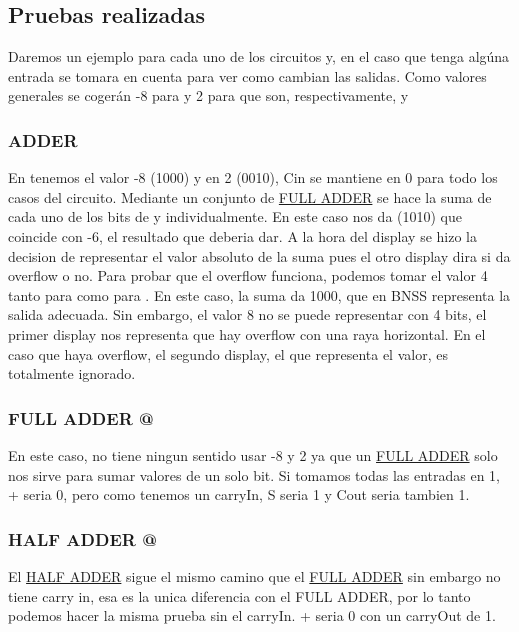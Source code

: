 \documentclass{article}
\begin{document}
\subsection{Pruebas realizadas}
Daremos un ejemplo para cada uno de los circuitos y, en el caso que tenga algúna entrada  se tomara en cuenta para ver como cambian las salidas. Como valores generales se cogerán -8 para  y 2 para  que son, respectivamente,  y 
\subsubsection{ADDER}
En  tenemos el valor -8 (1000) y en  2 (0010), Cin se mantiene en 0 para todo los casos del circuito. Mediante un conjunto de \hyperref[sec:FULLADDER]{FULL ADDER} se hace la suma de cada uno de los bits de  y  individualmente. En este caso  nos da (1010) que coincide con -6, el resultado que deberia dar. A la hora del display se hizo la decision de representar el valor absoluto de la suma pues el otro display dira si da overflow o no. Para probar que el overflow funciona, podemos tomar el valor 4 tanto para  como para . En este caso, la suma da 1000, que en BNSS representa la salida adecuada. Sin embargo, el valor 8 no se puede representar con 4 bits, el primer display nos representa que hay overflow con una raya horizontal. En el caso que haya overflow, el segundo display, el que representa el valor, es totalmente ignorado.

\subsubsection{FULL ADDER @}
En este caso, no tiene ningun sentido usar -8 y 2 ya que un \hyperref[sec:FULLADDER]{FULL ADDER} solo nos sirve para sumar valores de un solo bit. Si tomamos todas las entradas en 1,  +  seria 0, pero como tenemos un carryIn, S seria 1 y Cout seria tambien 1. 

\subsubsection{HALF ADDER @}
El \hyperref[sec:HALFADDER]{HALF ADDER} sigue el mismo camino que el \hyperref[sec:FULLADDER]{FULL ADDER} sin embargo no tiene carry in, esa es la unica diferencia con el FULL ADDER, por lo tanto podemos hacer la misma prueba sin el carryIn.  +  seria 0 con un carryOut de 1.
\end{document}
